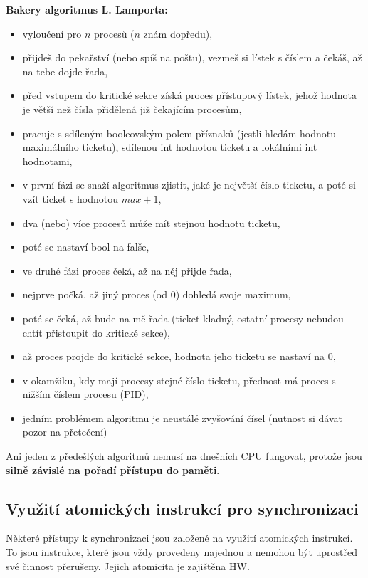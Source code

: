 \documentclass[a4paper, 11pt]{article}
\begin{document}
\textbf{Bakery algoritmus L. Lamporta:}
\begin{itemize}
    \item vyloučení pro $n$ procesů ($n$ znám dopředu),
    \item přijdeš do pekařství (nebo spíš na poštu), vezmeš si lístek s číslem a čekáš, až na tebe dojde řada,
    \item před vstupem do kritické sekce získá proces přístupový lístek, jehož hodnota je větší než čísla přidělená již čekajícím procesům,
    \item pracuje s sdíleným booleovským polem příznaků (jestli hledám hodnotu maximálního ticketu), sdílenou int hodnotou ticketu a lokálními int hodnotami,
    \item v první fázi se snaží algoritmus zjistit, jaké je největší číslo ticketu, a poté si vzít ticket s hodnotou $max+1$,
    \item dva (nebo) více procesů může mít stejnou hodnotu ticketu,
    \item poté se nastaví bool na falše,
    \item ve druhé fázi proces čeká, až na něj přijde řada,
    \item nejprve počká, až jiný proces (od 0) dohledá svoje maximum,
    \item poté se čeká, až bude na mě řada (ticket kladný, ostatní procesy nebudou chtít přistoupit do kritické sekce),
    \item až proces projde do kritické sekce, hodnota jeho ticketu se nastaví na 0,
    \item v okamžiku, kdy mají procesy stejné číslo ticketu, přednost má proces s nižším číslem procesu (PID),
    \item jedním problémem algoritmu je neustálé zvyšování čísel (nutnost si dávat pozor na přetečení)
\end{itemize}
 
Ani jeden z předešlých algoritmů nemusí na dnešních CPU fungovat, protože jsou \textbf{silně závislé na pořadí přístupu do paměti}.

\newpage

\subsection{Využití atomických instrukcí pro synchronizaci}
Některé přístupy k synchronizaci jsou založené na využití atomických instrukcí. To jsou instrukce, které jsou vždy provedeny najednou a nemohou být uprostřed své činnost přerušeny. Jejich atomicita je zajištěna HW. 
 
\end{document}
